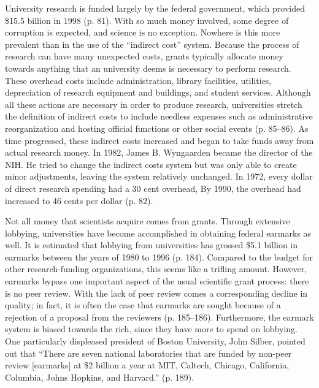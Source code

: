 \documentclass{article}[12pt]
\begin{document}
University research is funded largely by the federal government, which provided
\$15.5 billion in 1998 (p. 81). With so much money involved, some degree
of corruption is expected, and science is no exception.  Nowhere is this more
prevalent than in the use of the ``indirect cost'' system.  Because the process
of research can have many unexpected costs, grants typically allocate money
towards anything that an university deems is necessary to perform research.
These overhead costs include administration, library facilities, utilities,
depreciation of research equipment and buildings, and student services.
Although all these actions are necessary in order to produce research,
universities stretch the definition of indirect costs to include needless
expenses such as administrative reorganization and hosting official functions
or other social events (p. 85--86).  As time progressed, these indirect
costs increased and began to take funds away from actual research money.  In
1982, James B. Wyngaarden became the director of the NIH.  He tried to change
the indirect costs system but was only able to create minor adjustments,
leaving the system relatively unchanged.  In 1972, every dollar of direct
research spending had a 30 cent overhead,  By 1990, the overhead had increased
to 46 cents per dollar (p. 82).  

Not all money that scientists acquire comes from grants. Through extensive
lobbying, universities have become accomplished in obtaining federal earmarks
as well. It is estimated that lobbying from universities has grossed \$5.1
billion in earmarks between the years of 1980 to 1996 (p. 184). Compared to the
budget for other research-funding organizations, this seems like a trifling
amount. However, earmarks bypass one important aspect of the usual scientific
grant process: there is no peer review. With the lack of peer review comes a
corresponding decline in quality; in fact, it is often the case that earmarks
are sought because of a rejection of a proposal from the reviewers (p.
185--186). Furthermore, the earmark system is biased towards the rich, since
they have more to spend on lobbying. One particularly displeased president of
Boston University, John Silber, pointed out that ``There are seven national
laboratories that are funded by non-peer review [earmarks] at \$2 billion a
year at MIT, Caltech, Chicago, California, Columbia, Johns Hopkins, and
Harvard.'' (p. 189).
\end{document}
